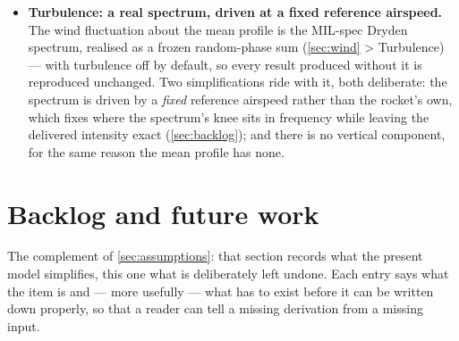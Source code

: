 \documentclass[10pt]{extarticle}
\numberwithin{equation}{subsection}
\begin{document}
\begin{itemize}
    at every solver call, with no integral or derivative term and no notion of a previous sample
    (\autoref{sec:airbrake_law}). The \emph{integration} no longer rules out a law with memory: an
    opt-in fixed-rate, zero-order-hold mode (\autoref{sec:sampled}) evaluates a sampled quantity
    once per tick and holds it until the next, so that a value surviving from one tick to the next
    is well defined. A controller with memory is therefore expressible but unwritten --- what is
    missing is the law, not somewhere to run it (\autoref{sec:backlog}).
    \item \textbf{Turbulence: a real spectrum, driven at a fixed reference airspeed.} The wind
    fluctuation about the mean profile is the MIL-spec Dryden spectrum, realised as a frozen
    random-phase sum (\autoref{sec:wind} > Turbulence) --- with turbulence off by default, so every
    result produced without it is reproduced unchanged. Two simplifications ride with it, both
    deliberate: the spectrum is driven by a \emph{fixed} reference airspeed rather than the
    rocket's own, which fixes where the spectrum's knee sits in frequency while leaving the
    delivered intensity exact (\autoref{sec:backlog}); and there is no vertical component, for the
    same reason the mean profile has none.
\end{itemize}

\newpage


\newpage


\newpage


\newpage
\section{Backlog and future work}\label{sec:backlog}
The complement of \autoref{sec:assumptions}: that section records what the present model
simplifies, this one what is deliberately left undone. Each entry says what the item is and ---
more usefully --- what has to exist before it can be written down properly, so that a reader can
tell a missing derivation from a missing input.
\end{document}
